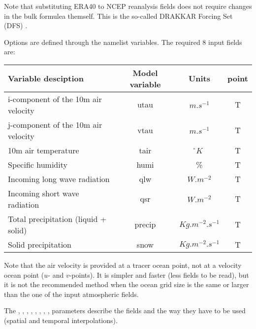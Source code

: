 \documentclass[../tex_main/NEMO_manual]{subfiles}
\begin{document}
Note that substituting ERA40 to NCEP reanalysis fields 
does not require changes in the bulk formulea themself. 
This is the so-called DRAKKAR Forcing Set (DFS) \citep{Brodeau_al_OM09}. 

Options are defined through the   namelist variables.
The required 8 input fields are:

\begin{table}[htbp]   \label{tab:CORE}
\begin{center}
\begin{tabular}{|l|c|c|c|}
\hline
Variable desciption					& Model variable	& Units	 & point \\		\hline
i-component of the 10m air velocity	& utau		& $m.s^{-1}$			& T  \\ 	\hline
j-component of the 10m air velocity	& vtau		& $m.s^{-1}$			& T  \\	\hline
10m air temperature					& tair		& \r{}$K$				& T 	\\	\hline
Specific humidity					& humi		& \%					& T \\		\hline
Incoming long wave radiation		& qlw		& $W.m^{-2}$			& T \\		\hline
Incoming short wave radiation		& qsr		& $W.m^{-2}$			& T \\		\hline
Total precipitation (liquid + solid)	& precip	& $Kg.m^{-2}.s^{-1}$	& T \\ 	\hline
Solid precipitation					& snow		& $Kg.m^{-2}.s^{-1}$	& T \\	\hline
\end{tabular}
\end{center}
\end{table}

Note that the air velocity is provided at a tracer ocean point, not at a velocity ocean 
point ($u$- and $v$-points). It is simpler and faster (less fields to be read), 
but it is not the recommended method when the ocean grid size is the same 
or larger than the one of the input atmospheric fields.

The , , , , , ,
, ,  parameters describe the fields 
and the way they have to be used (spatial and temporal interpolations). 
\end{document}

